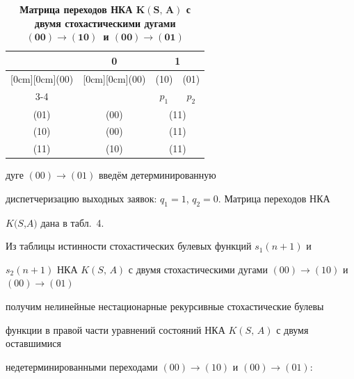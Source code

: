 \begin{table}

\centering \small

\caption{\bf Матрица переходов НКА $\boldsymbol{K(S,\,A)}$ с двумя стохастическими дугами \mbox{$\boldsymbol{(00) \to

(10)}$}~и $\boldsymbol{(00) \to (01)}$} \vspace{-3mm}

\begin{tabular}{|c|c|c|c|}\hline

 & 0 & \multicolumn{2}{c|}{1}  \\ \hline

\raisebox{-1.50ex}[0cm][0cm]{(00)}&

\raisebox{-1.50ex}[0cm][0cm]{(00)}&

(10)& (01) \\ \cline{3-4}

 &  & $p_1$ & $p_2$ \\ \hline

(01)& (00) & \multicolumn{2}{|c|}{(11)}  \\ \hline

(10)& (00) & \multicolumn{2}{|c|}{(11)}  \\ \hline

(11)& (10) & \multicolumn{2}{|c|}{(11)}  \\ \hline

\end{tabular}

\end{table}



\noindent дуге $(00)\to (01)$ введём детерминированную

диспетчеризацию выходных заявок: $q_1=1$, $q_2=0$. Матрица переходов НКА

$K(S$,$A)$ дана в табл.~4.





Из таблицы истинности стохастических булевых функций $s_1(n+1)$ и

$s_2(n+1)$ НКА $K(S,\,A)$ с двумя стохастическими дугами $(00) \to (10)$ и $(00) \to (01)$

получим нелинейные нестационарные рекурсивные стохастические булевы

функции в правой части уравнений состояний НКА $K(S,\,A)$ с двумя оставшимися

недетерминированными переходами $(00)\to (10)$ и $(00) \to (01)$:

